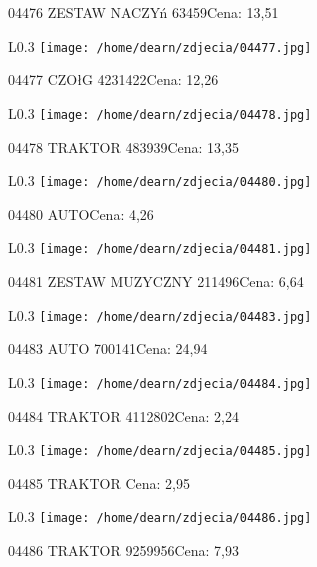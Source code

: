 04476 ZESTAW NACZYń  63459Cena: 13,51\newline
\begin{wrapfigure}{L}{0.3\textwidth}
\texttt{[image: /home/dearn/zdjecia/04477.jpg]}
\end{wrapfigure}
04477 CZOłG                                          4231422Cena: 12,26\newline
\begin{wrapfigure}{L}{0.3\textwidth}
\texttt{[image: /home/dearn/zdjecia/04478.jpg]}
\end{wrapfigure}
04478 TRAKTOR                                         483939Cena: 13,35\newline
\begin{wrapfigure}{L}{0.3\textwidth}
\texttt{[image: /home/dearn/zdjecia/04480.jpg]}
\end{wrapfigure}
04480 AUTOCena: 4,26\newline
\begin{wrapfigure}{L}{0.3\textwidth}
\texttt{[image: /home/dearn/zdjecia/04481.jpg]}
\end{wrapfigure}
04481 ZESTAW MUZYCZNY                                211496Cena: 6,64\newline
\begin{wrapfigure}{L}{0.3\textwidth}
\texttt{[image: /home/dearn/zdjecia/04483.jpg]}
\end{wrapfigure}
04483 AUTO                                           700141Cena: 24,94\newline
\begin{wrapfigure}{L}{0.3\textwidth}
\texttt{[image: /home/dearn/zdjecia/04484.jpg]}
\end{wrapfigure}
04484 TRAKTOR                                        4112802Cena: 2,24\newline
\begin{wrapfigure}{L}{0.3\textwidth}
\texttt{[image: /home/dearn/zdjecia/04485.jpg]}
\end{wrapfigure}
04485 TRAKTOR    Cena: 2,95\newline
\begin{wrapfigure}{L}{0.3\textwidth}
\texttt{[image: /home/dearn/zdjecia/04486.jpg]}
\end{wrapfigure}
04486 TRAKTOR                                       9259956Cena: 7,93\newline
